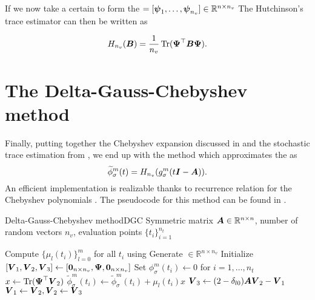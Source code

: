 If we now take a certain  to form the
 $= [\boldsymbol{\psi}_1, \dots, \boldsymbol{\psi}_{n_v}] \in \mathbb{R}^{n \times n_v}$
The Hutchinson's trace estimator can then be written as \cite{hutchinson1990trace}

\begin{equation}
    H_{n_v}(\boldsymbol{B}) = \frac{1}{n_v} \operatorname{Tr}(\boldsymbol{\Psi}^{\top} \boldsymbol{B} \boldsymbol{\Psi}).
    \label{equ:2-chebyshev-DGC-hutchionson-estimator}
\end{equation}


\section{The Delta-Gauss-Chebyshev method}
\label{sec:2-chebyshev-delta-gauss-chebyshev}

Finally, putting together the 
Chebyshev expansion discussed in  and 
the stochastic trace estimation from ,
we end up with the  method \cite[Algorithm~2]{lin2017randomized}
which approximates the  as
\begin{equation}
    \widetilde{\phi}_{\sigma}^m(t) = H_{n_v}(g_{\sigma}^m(t\boldsymbol{I} - \boldsymbol{A})).
    \label{equ:2-chebyshev-DGC-final-estimator}
\end{equation}
An efficient implementation is realizable thanks to recurrence relation for the
Chebyshev polynomials . The pseudocode
for this method can be found in .

\begin{algo}{Delta-Gauss-Chebyshev method}{DGC}
    Symmetric matrix $\boldsymbol{A} \in \mathbb{R}^{n \times n}$, number of random vectors $n_v$,
    evaluation points $\{t_i\}_{i=1}^{n_t}$
    \begin{algorithmic}[1]
        \State Compute $\{\mu_l(t_i)\}_{l=0}^m$ for all $t_i$ using 
        \State Generate  $\in \mathbb{R}^{n \times n_v}$
        \State Initialize $[\boldsymbol{V}_1, \boldsymbol{V}_2, \boldsymbol{V}_3] \gets [\boldsymbol{0}_{n \times n_v}, \boldsymbol{\Psi}, \boldsymbol{0}_{n \times n_v}]$
        \State Set ${\phi}_{\sigma}^m(t_i) \gets 0$ for $i=1,\dots,n_t$
          \State $x \gets \operatorname{Tr}(\boldsymbol{\Psi}^{\top} \boldsymbol{V}_2)$
            \State $\widetilde{\phi}_{\sigma}^m(t_i) \gets \widetilde{\phi}_{\sigma}^m(t_i) + \mu_l(t_i) x$
          \EndFor
          \State $\boldsymbol{V}_3 \gets (2 - \delta_{l0}) \boldsymbol{A} \boldsymbol{V}_2 - \boldsymbol{V}_1$ 
          \State $\boldsymbol{V}_1 \gets \boldsymbol{V}_2, \boldsymbol{V}_2 \gets \boldsymbol{V}_3$
        \EndFor
    \end{algorithmic}
\end{algo}

